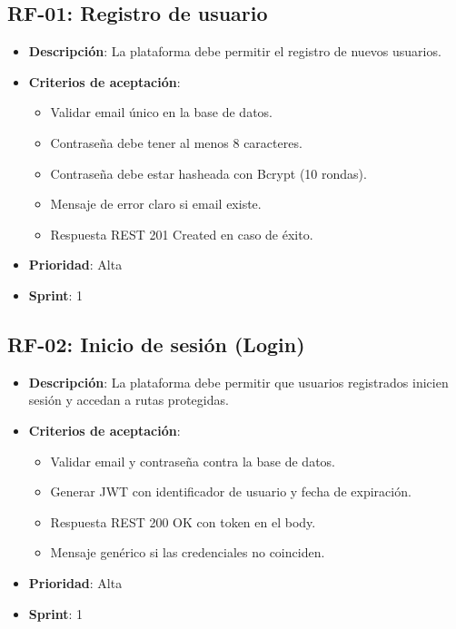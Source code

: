 \documentclass[12pt,a4paper]{article}
\begin{document}
\subsection{RF-01: Registro de usuario}
\begin{itemize}[leftmargin=*]
    \item \textbf{Descripci\'on}: La plataforma debe permitir el registro de nuevos usuarios.
    \item \textbf{Criterios de aceptaci\'on}:
    \begin{itemize}[leftmargin=*]
        \item Validar email \'unico en la base de datos.
        \item Contrase\~na debe tener al menos 8 caracteres.
        \item Contrase\~na debe estar hasheada con Bcrypt (10 rondas).
        \item Mensaje de error claro si email existe.
        \item Respuesta REST 201 Created en caso de \'exito.
    \end{itemize}
    \item \textbf{Prioridad}: Alta
    \item \textbf{Sprint}: 1
\end{itemize}

\subsection{RF-02: Inicio de sesi\'on (Login)}
\begin{itemize}[leftmargin=*]
    \item \textbf{Descripci\'on}: La plataforma debe permitir que usuarios registrados inicien sesi\'on y accedan a rutas protegidas.
    \item \textbf{Criterios de aceptaci\'on}:
    \begin{itemize}[leftmargin=*]
        \item Validar email y contrase\~na contra la base de datos.
        \item Generar JWT con identificador de usuario y fecha de expiraci\'on.
        \item Respuesta REST 200 OK con token en el body.
        \item Mensaje gen\'erico si las credenciales no coinciden.
    \end{itemize}
    \item \textbf{Prioridad}: Alta
    \item \textbf{Sprint}: 1
\end{itemize}
\end{document}
